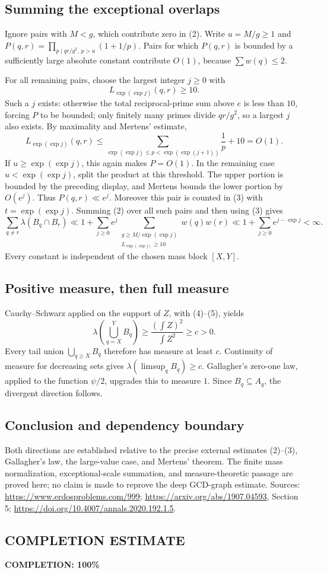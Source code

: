 \subsection*{Summing the exceptional overlaps}
Ignore pairs with $M<g$, which contribute zero in (2).
Write $u=M/g\ge1$ and $P(q,r)=\prod_{p\mid qr/g^2,\ p>u}(1+1/p)$.
Pairs for which $P(q,r)$ is bounded by a sufficiently large absolute constant contribute $O(1)$, because $\sum w(q)\le2$.

For all remaining pairs, choose the largest integer $j\ge0$ with
\[
 L_{\exp(\exp j)}(q,r)\ge10.
\]
Such a $j$ exists: otherwise the total reciprocal-prime sum above $e$ is less than $10$, forcing $P$ to be bounded; only finitely many primes divide $qr/g^2$, so a largest $j$ also exists.
By maximality and Mertens' estimate,
\[
 L_{\exp(\exp j)}(q,r)
 \le\sum_{\exp(\exp j)\le p<\exp(\exp(j+1))}\frac1p+10=O(1).
\]
If $u\ge\exp(\exp j)$, this again makes $P=O(1)$.
In the remaining case $u<\exp(\exp j)$, split the product at this threshold. The upper portion is bounded by the preceding display, and Mertens bounds the lower portion by $O(e^j)$. Thus $P(q,r)\ll e^j$.
Moreover this pair is counted in (3) with $t=\exp(\exp j)$.
Summing (2) over all such pairs and then using (3) gives
\[
 \sum_{q\ne r}\lambda(B_q\cap B_r)
 \ll1+\sum_{j\ge0}e^j
 \sum_{\substack{g\ge M/\exp(\exp j)\\L_{\exp(\exp j)}\ge10}}w(q)w(r)
 \ll1+\sum_{j\ge0}e^{j-\exp j}<\infty.
 \tag{5}
\]
Every constant is independent of the chosen mass block $[X,Y]$.

\subsection*{Positive measure, then full measure}
Cauchy--Schwarz applied on the support of $Z$, with (4)--(5), yields
\[
 \lambda\left(\bigcup_{q=X}^{Y}B_q\right)
 \ge\frac{(\int Z)^2}{\int Z^2}\ge c>0.
\]
Every tail union $\bigcup_{q\ge X}B_q$ therefore has measure at least $c$.
Continuity of measure for decreasing sets gives
$\lambda(\limsup_qB_q)\ge c$.
Gallagher's zero-one law, applied to the function $\psi/2$, upgrades this to measure $1$. Since $B_q\subseteq A_q$, the divergent direction follows.

\subsection*{Conclusion and dependency boundary}
Both directions are established relative to the precise external estimates (2)--(3), Gallagher's law, the large-value case, and Mertens' theorem. The finite mass normalization, exceptional-scale summation, and measure-theoretic passage are proved here; no claim is made to reprove the deep GCD-graph estimate. Sources: \url{https://www.erdosproblems.com/999}; \url{https://arxiv.org/abs/1907.04593}, Section 5; \url{https://doi.org/10.4007/annals.2020.192.1.5}.
\subsection*{COMPLETION ESTIMATE}
\textbf{COMPLETION: 100\%}
